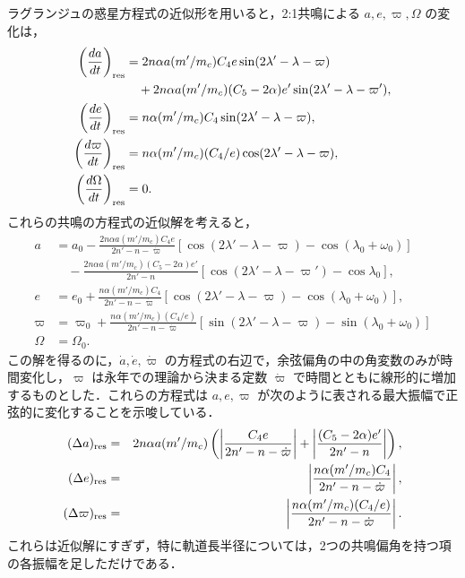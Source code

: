 \documentclass[11pt,a4paper,oneside,onecolumn]{jarticle}
\begin{document}
ラグランジュの惑星方程式の近似形を用いると，2:1共鳴による $a, e, \varpi, \Omega$ の変化は，
\begin{align} 
\left( \frac{d a}{d t} \right)_{\rm res} & = 2 n \alpha a (m' / m_c) C_4 e \sin (2 \lambda' - \lambda - \varpi)\nonumber \\
& \quad + 2 n \alpha a (m' / m_c) (C_5 - 2 \alpha) e' \sin (2 \lambda' - \lambda - \varpi'), \\
\left( \frac{d e}{d t} \right)_{\rm res} & = n \alpha (m' / m_c) C_4 \sin (2 \lambda' - \lambda - \varpi), \\
\left( \frac{d \varpi}{d t} \right)_{\rm res} & = n \alpha (m' / m_c) (C_4 / e) \cos (2 \lambda' - \lambda - \varpi), \\
\left( \frac{d \Omega}{d t} \right)_{\rm res} & = 0.
\end{align}
これらの共鳴の方程式の近似解を考えると，
\begin{align}
a & = a_0 - \frac{2 n \alpha a (m' / m_c) C_4 e}{2 n' - n - \dot{\varpi}} [ \cos (2 \lambda' - \lambda - \varpi) - \cos (\lambda_0 + \omega_0) ] \nonumber \\
& \quad - \frac{2 n \alpha a (m' / m_c) (C_5 - 2 \alpha) e'}{2 n' - n} [\cos (2 \lambda' - \lambda - \varpi') - \cos \lambda_0 ], \\
e & = e_0 + \frac{n \alpha (m' / m_c) C_4}{2 n' - n - \dot{\varpi}} [\cos (2 \lambda' - \lambda - \varpi) - \cos (\lambda_0 + \omega_0) ], \\
\varpi & = \varpi_0 + \frac{n \alpha (m' / m_c) (C_4 / e)}{2 n' - n - \dot{\varpi}} [\sin (2 \lambda' - \lambda - \varpi) - \sin (\lambda_0 + \omega_0) ] \\
\Omega & = \Omega_0.
\end{align}
この解を得るのに，$\dot{a}, \dot{e}, \dot{\varpi}$ の方程式の右辺で，余弦偏角の中の角変数のみが時間変化し，$\varpi$ は永年での理論から決まる定数 $\dot{\varpi}$ で時間とともに線形的に増加するものとした．これらの方程式は $a, e, \varpi$ が次のように表される最大振幅で正弦的に変化することを示唆している．
\begin{eqnarray}
(\Delta a)_{\rm res} & = & 2 n \alpha a (m' / m_c) \left( \left| \frac{C_4 e}{2 n' - n - \dot{\varpi}} \right| + \left| \frac{(C_5 - 2 \alpha) e'}{2 n' - n} \right| \right), \label{eq:Delta_a} \\
(\Delta e)_{\rm res} & = & \left| \frac{n \alpha (m' / m_c) C_4}{2 n' - n - \dot{\varpi}} \right|, \label{eq:Delta_e} \\
(\Delta \varpi)_{\rm res} & = & \left| \frac{n \alpha (m' / m_c) (C_4 / e)}{2 n' - n - \dot{\varpi}} \right|. \label{eq:Delta_varpi}
\end{eqnarray}
これらは近似解にすぎず，特に軌道長半径については，2つの共鳴偏角を持つ項の各振幅を足しただけである．
\end{document}
